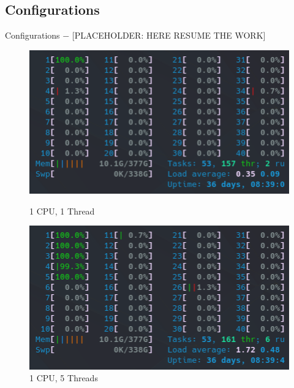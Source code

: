


\subsection{Configurations}
Configurations $-$ [PLACEHOLDER: HERE RESUME THE WORK]

\begin{figure}[!h]
    \centering
    \captionsetup{width=.48\linewidth}
    \begin{minipage}[t]{0.48\textwidth}
        \includegraphics[width=\textwidth]{figures/htop_cpus/1CPU_1Thread.png}
        \caption{1 CPU, 1 Thread}\label{fig:1CPU_1Thread}
    \end{minipage}
    \hspace{0.4cm}
    \centering
    \captionsetup{width=.48\linewidth}
    \begin{minipage}[t]{0.48\textwidth}
        \includegraphics[width=\textwidth]{figures/htop_cpus/1CPU_5Threads.png}
        \caption{1 CPU, 5 Threads}\label{fig:1CPU_5Threads}
    \end{minipage}


\end{figure}
